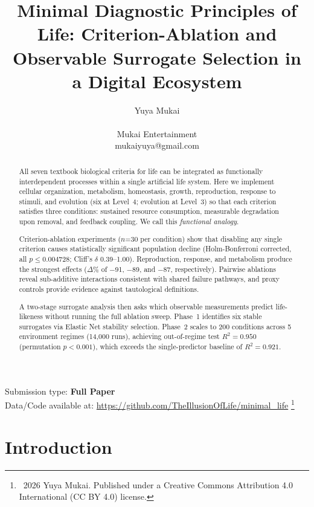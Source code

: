 \documentclass[letterpaper]{article}
\title{Minimal Diagnostic Principles of Life: Criterion-Ablation and\\Observable Surrogate Selection in a Digital Ecosystem}
\author{Yuya Mukai \\
\mbox{}\\
Mukai Entertainment \\
mukaiyuya@gmail.com}
\newcommand\blfootnote[1]{%
  \begingroup
  \renewcommand\thefootnote{}\footnote{#1}%
  \addtocounter{footnote}{-1}%
  \endgroup
}
\begin{document}
\maketitle

\begin{abstract}
All seven textbook biological criteria for life can be integrated as
functionally interdependent processes within a single artificial life system.
Here we implement cellular organization, metabolism, homeostasis, growth,
reproduction, response to stimuli, and evolution (six at Level~4; evolution
at Level~3) so that each criterion satisfies three conditions:
sustained resource consumption, measurable degradation upon removal,
and feedback coupling. We call this \emph{functional analogy}.

Criterion-ablation experiments ($n$=30 per condition) show that disabling
any single criterion causes statistically significant population decline
(Holm-Bonferroni corrected, all $p \leq 0.004728$; Cliff's $\delta$
0.39--1.00). Reproduction, response, and metabolism produce the strongest
effects ($\Delta\%$ of $-$91, $-$89, and $-$87, respectively). Pairwise
ablations reveal sub-additive interactions consistent with shared failure
pathways, and proxy controls provide evidence against tautological definitions.

A two-stage surrogate analysis then asks which observable measurements
predict life-likeness without running the full ablation sweep.
Phase~1 identifies six stable surrogates via Elastic Net stability selection.
Phase~2 scales to 200 conditions across 5 environment regimes (14{,}000 runs),
achieving out-of-regime test $R^2 = 0.950$ (permutation $p < 0.001$),
which exceeds the single-predictor baseline of $R^2 = 0.921$.
\end{abstract}

Submission type: \textbf{Full Paper}\\
Data/Code available at: \url{https://github.com/TheIllusionOfLife/minimal_life}
\blfootnote{\textcopyright\ 2026 Yuya Mukai. Published under a Creative Commons Attribution 4.0 International (CC BY 4.0) license.}

\section{Introduction}
\end{document}
